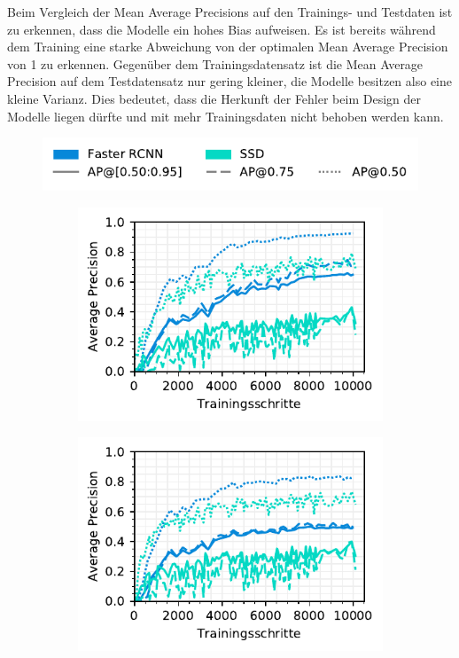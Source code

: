 Beim Vergleich der Mean Average Precisions auf den Trainings- und Testdaten ist zu erkennen, dass die Modelle ein hohes Bias aufweisen. Es ist bereits während dem Training eine starke Abweichung von der optimalen Mean Average Precision von 1 zu erkennen. Gegenüber dem Trainingsdatensatz ist die Mean Average Precision auf dem Testdatensatz nur gering kleiner, die Modelle besitzen also eine kleine Varianz. Dies bedeutet, dass die Herkunft der Fehler beim Design der Modelle liegen dürfte und mit mehr Trainingsdaten nicht behoben werden kann. 

\begin{figure}[H]
  \captionsetup{width=.9\linewidth}
  \caption{Average Precision auf den Trainings- und Testdaten des Faster-RCNN und SSD Modells}
  \label{fig:3ap-map}
  \centering
  \includegraphics[scale=1]{graphics/matplot/img-detection__legend_3.pdf}
  \begin{subfigure}[t]{0.5\linewidth}
    \centering
    \includegraphics[scale=1]{graphics/matplot/img-detection__all__ap__train.pdf}
    \label{fig:3ap-map:map_train}
    \vspace{2ex}
  \end{subfigure}%
  \begin{subfigure}[t]{0.5\linewidth}
    \centering
    \includegraphics[scale=1]{graphics/matplot/img-detection__all__ap.pdf}

\end{subfigure}
\end{figure}

